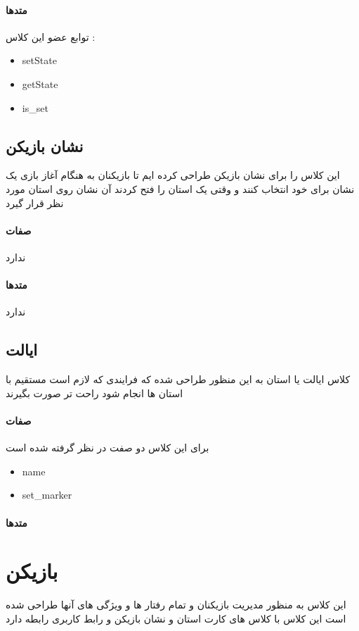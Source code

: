 \documentclass[pdf,titlepage,a4paper]{report}
\begin{document}
	\paragraph{متدها}
	 توابع عضو این کلاس :
	 \begin{latin}
		\begin{itemize}
			\item setState
	 		\item getState
	 		\item is\_set 
		\end{itemize}
	 \end{latin}
	 
	\subsection{نشان بازیکن}
	این کلاس را برای نشان بازیکن طراحی کرده ایم تا بازیکنان به هنگام آغاز بازی یک نشان برای خود انتخاب کنند و وقتی یک استان را فتح کردند آن نشان روی استان مورد نظر قرار گیرد
	\paragraph{صفات}
	ندارد
	\paragraph{متدها}
	ندارد
	
	\subsection{ایالت}
	کلاس ایالت یا استان به این منظور طراحی شده که فرایندی که لازم است مستقیم با استان ها انجام شود راحت تر صورت بگیرند 

	\paragraph{صفات}
	 برای این کلاس دو صفت در نظر گرفته شده است
	 \begin{latin}
	 	\begin{itemize}
	 		\item name
	 		\item set\_marker
	 	\end{itemize}
	 \end{latin}
	\paragraph{متدها}
	
	\section{بازیکن}
	این کلاس به منظور مدیریت بازیکنان و تمام رفتار ها و ویژگی های آنها طراحی شده است 
	 این کلاس با کلاس های کارت استان و نشان بازیکن و رابط کاربری رابطه دارد
\end{document}
